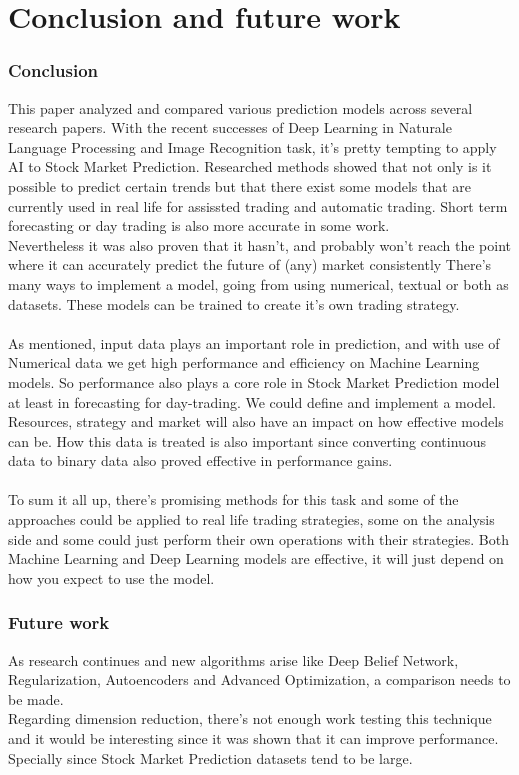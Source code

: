 \documentclass[conference]{IEEEtran}
\begin{document}
\section{Conclusion and future work}
\subsubsection*{Conclusion}
This paper analyzed and compared various prediction models across several research papers. With the recent successes of Deep Learning in Naturale Language Processing and Image Recognition task, it's pretty tempting to apply AI to Stock Market Prediction. Researched methods showed that not only is it possible to predict certain trends but that there exist some models that are
currently used in real life for assissted trading and automatic trading. Short term forecasting or day trading is also more accurate in some work.
\\
Nevertheless it was also proven that it hasn't, and probably won't reach the point where it can accurately predict the future of (any) market consistently
There's many ways to implement a model, going from using numerical, textual or both as datasets. These models can be trained to create it's own trading strategy.
\\\\
As mentioned, input data plays an important role in prediction, and with use of Numerical data we get high performance and efficiency on Machine Learning models. So performance also plays a core role in Stock Market Prediction model at least in forecasting for day-trading. We could define and implement a model. Resources, strategy and market will
also have an impact on how effective models can be. How this data is treated is also important since converting continuous data to binary data also proved effective in performance gains.
\\\\
To sum it all up, there's promising methods for this task and some of the approaches could be applied to real life trading strategies, some on the analysis side and some could just perform their own operations with their strategies. Both Machine Learning and Deep Learning models are effective, it will just depend on how you expect to use the model.
\subsubsection*{Future work}
As research continues and new algorithms arise like Deep Belief Network, Regularization, Autoencoders and Advanced Optimization, a comparison needs to be made.
\\
Regarding dimension reduction, there's not enough work testing this technique and it would be interesting since it was shown that it can improve performance. Specially since Stock Market Prediction datasets tend to be large.


\end{document}
